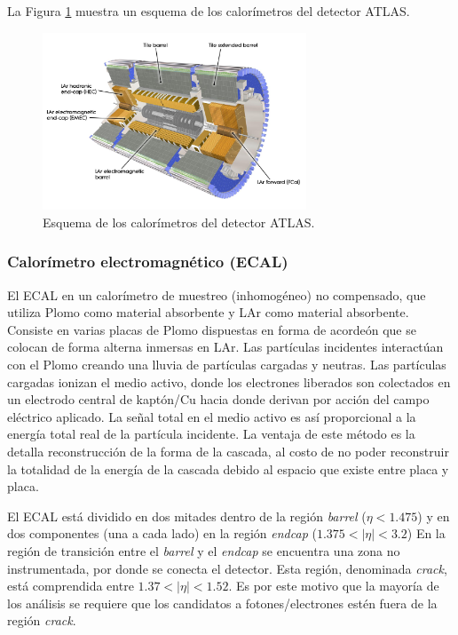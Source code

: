 La Figura \ref{calo_1} muestra un esquema de los calorímetros del detector ATLAS.

\begin{figure}
\centering
  \includegraphics[width=0.7\textwidth]{images/calo_1.jpg}
  \caption{Esquema de los calorímetros del detector ATLAS.}
  \label{calo_1}
\end{figure}

\subsubsection{Calorímetro electromagnético (ECAL)}

El ECAL en un calorímetro de muestreo (inhomogéneo) no compensado, que utiliza Plomo como material absorbente y LAr como material absorbente. Consiste en varias placas de Plomo dispuestas en forma de acordeón que se colocan de forma alterna inmersas en LAr. Las partículas incidentes interactúan con el Plomo creando una lluvia de partículas cargadas y neutras. Las partículas cargadas ionizan el medio activo, donde los electrones liberados son colectados en un electrodo central de kaptón/Cu hacia donde derivan por acción del campo eléctrico aplicado. La señal total en el medio activo es así proporcional a la energía total real de la partícula incidente. La ventaja de este método es la detalla reconstrucción de la forma de la cascada, al costo de no poder reconstruir la totalidad de la energía de la cascada debido al espacio que existe entre placa y placa.


El ECAL está dividido en dos mitades dentro de la
región \textit{barrel} ($\eta < 1.475$) y en dos componentes (una a cada
lado) en la región \textit{endcap} ($1.375 < |\eta| < 3.2$) En la región de transición entre el \textit{barrel} y el \textit{endcap} se encuentra una zona no instrumentada, por donde se conecta el detector. Esta región, denominada \textit{crack}, está comprendida entre $1.37 < |\eta| < 1.52$. Es por este motivo que la mayoría de los análisis se requiere que los candidatos a fotones/electrones estén fuera de la región \textit{crack}.

